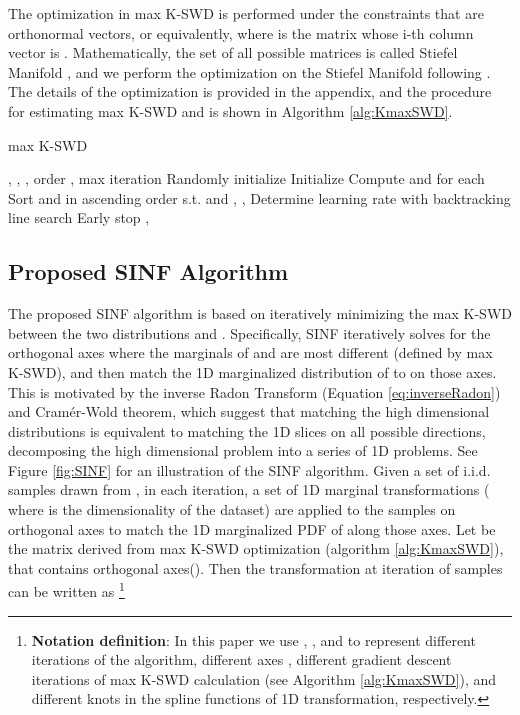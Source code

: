 \documentclass{article}
\begin{document}
The optimization in max K-SWD is performed under the constraints that  are orthonormal vectors, or equivalently,  where  is the matrix whose i-th column vector is . Mathematically, the set of all possible  matrices is called Stiefel Manifold , and we perform the optimization on the Stiefel Manifold following \citet{tagare2011notes}. The details of the optimization is provided in the appendix, and the procedure for estimating max K-SWD and  is shown in Algorithm \ref{alg:KmaxSWD}.

\begin{algorithm}[tb]
   \caption{max K-SWD}
   \label{alg:KmaxSWD}
\begin{algorithmic}
    , , , order , max iteration 
   \STATE Randomly initialize 
   \STATE Initialize 
   \STATE  
   \STATE Compute  and  for each  
   \STATE Sort  and  in ascending order s.t.  and 
   \STATE 
   \ENDFOR
   \STATE ,  , 
   \STATE Determine learning rate  with backtracking line search  
   \STATE Early stop
   \ENDIF
   \ENDFOR
    , 
\end{algorithmic}
\end{algorithm}

\subsection{Proposed SINF Algorithm}

\label{subsec:algorithm}
The proposed SINF algorithm is based on iteratively minimizing the max K-SWD between the two distributions  and . Specifically, SINF iteratively solves for the orthogonal axes where the marginals of  and  are most
different (defined by max K-SWD), and then match the 1D marginalized distribution of  to  on those axes. This is motivated by the inverse Radon Transform (Equation \ref{eq:inverseRadon}) and Cram{\'e}r-Wold theorem, which suggest that matching the high dimensional distributions is equivalent to matching the 1D slices on all possible directions, decomposing the high dimensional problem into a series of 1D problems. See Figure \ref{fig:SINF} for an illustration of the SINF algorithm. Given a set of i.i.d. samples  drawn from , in each iteration, a set of 1D marginal transformations  ( where  is the dimensionality of the dataset) are applied to the samples on orthogonal axes  to match the 1D marginalized PDF of  along those axes. Let  be the matrix derived from max K-SWD optimization (algorithm \ref{alg:KmaxSWD}), that contains  orthogonal axes(). Then the transformation at iteration  of samples  can be written as
\footnote{{\bf Notation definition}: In this paper we use , ,  and  to represent different iterations of the algorithm, different axes , different gradient descent iterations of max K-SWD calculation (see Algorithm \ref{alg:KmaxSWD}), and different knots in the spline functions of 1D transformation, respectively.}
\end{document}
